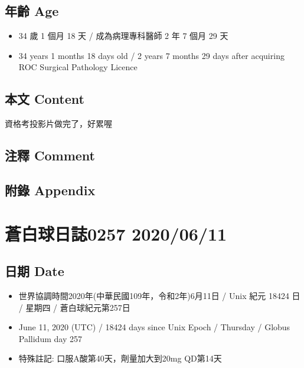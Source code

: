 \documentclass[
]{article}
\providecommand{\tightlist}{%
  \setlength{\itemsep}{0pt}\setlength{\parskip}{0pt}}
\begin{document}
\hypertarget{ux5e74ux9f61-age-9}{%
\subsection{年齡 Age}\label{ux5e74ux9f61-age-9}}

\begin{itemize}
\tightlist
\item
  34 歲 1 個月 18 天 / 成為病理專科醫師 2 年 7 個月 29 天
\item
  34 years 1 months 18 days old / 2 years 7 months 29 days after
  acquiring ROC Surgical Pathology Licence
\end{itemize}

\hypertarget{ux672cux6587-content-9}{%
\subsection{本文 Content}\label{ux672cux6587-content-9}}

資格考投影片做完了，好累喔

\hypertarget{ux6ce8ux91cb-comment-9}{%
\subsection{注釋 Comment}\label{ux6ce8ux91cb-comment-9}}

\hypertarget{ux9644ux9304-appendix-9}{%
\subsection{附錄 Appendix}\label{ux9644ux9304-appendix-9}}

\hypertarget{ux84bcux767dux7403ux65e5ux8a8c0257-20200611}{%
\section{蒼白球日誌0257
2020/06/11}\label{ux84bcux767dux7403ux65e5ux8a8c0257-20200611}}

\hypertarget{ux65e5ux671f-date-10}{%
\subsection{日期 Date}\label{ux65e5ux671f-date-10}}

\begin{itemize}
\tightlist
\item
  世界協調時間2020年(中華民國109年，令和2年)6月11日 / Unix 紀元 18424 日
  / 星期四 / 蒼白球紀元第257日
\item
  June 11, 2020 (UTC) / 18424 days since Unix Epoch / Thursday / Globus
  Pallidum day 257
\item
  特殊註記: 口服A酸第40天，劑量加大到20mg QD第14天
\end{itemize}
\end{document}
